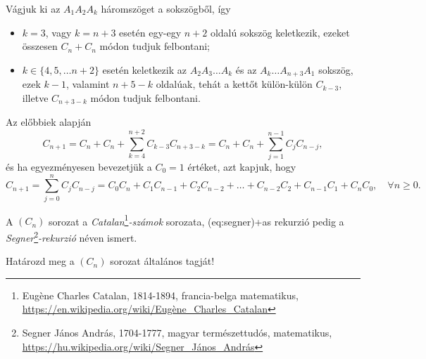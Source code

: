 \begin{solution}
\par Vágjuk ki az $A_{1}A_{2}A_{k}$ háromszöget a sokszögből, így
\begin{itemize} 

\item $k=3$, vagy $k=n+3$ esetén egy-egy $n+2$ oldalú sokszög
keletkezik, ezeket összesen $C_{n}+C_{n}$ módon tudjuk felbontani; 

\item $k\in\{4,5,\dots n+2\}$ esetén keletkezik az $A_{2}A_{3}\dots A_{k}$
és az $A_{k}\dots A_{n+3}A_{1}$ sokszög, ezek $k-1$, valamint $n+5-k$
oldalúak, tehát a kettőt külön-külön $C_{k-3}$, illetve $C_{n+3-k}$
módon tudjuk felbontani. \end{itemize} Az előbbiek alapján 
\[
C_{n+1}=C_{n}+C_{n}+\sum_{k=4}^{n+2}C_{k-3}C_{n+3-k}=C_{n}+C_{n}+\sum_{j=1}^{n-1}C_{j}C_{n-j},
\]
és ha egyezményesen bevezetjük a $C_{0}=1$ értéket, azt kapjuk, hogy
\begin{equation}
C_{n+1}=\sum_{j=0}^{n}C_{j}C_{n-j}=C_{0}C_{n}+C_{1}C_{n-1}+C_{2}C_{n-2}+\ldots+C_{n-2}C_{2}+C_{n-1}C_{1}+C_{n}C_{0},\quad\forall n\ge0.\label{eq:segner}
\end{equation}

A $(C_{n})$ sorozat a \emph{Catalan}\cprotect\footnote{Eugène Charles Catalan, 1814-1894, francia-belga matematikus, \url{https://en.wikipedia.org/wiki/Eugène_Charles_Catalan}}\emph{-számok}
sorozata, \told\aref({eq:segner})+as{} rekurzió pedig a \emph{Segner}\cprotect\footnote{Segner János András, 1704-1777, magyar természettudós, matematikus,
\url{https://hu.wikipedia.org/wiki/Segner_János_András}}\emph{-rekurzió} néven ismert.
\end{solution}
\begin{problem}
Határozd meg a $(C_{n})$ sorozat általános tagját!
\end{problem}
